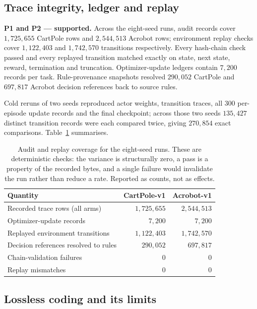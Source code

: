\documentclass[11pt,a4paper]{article}
\begin{document}
\subsection{Trace integrity, ledger and replay}
\label{sec:res-audit}

\textbf{P1 and P2 --- supported.} Across the eight-seed runs, audit records cover $1{,}725{,}655$ CartPole rows and $2{,}544{,}513$ Acrobot rows; environment replay checks cover $1{,}122{,}403$ and $1{,}742{,}570$ transitions respectively. Every hash-chain check passed and every replayed transition matched exactly on state, next state, reward, termination and truncation. Optimizer-update ledgers contain $7{,}200$ records per task. Rule-provenance snapshots resolved $290{,}052$ CartPole and $697{,}817$ Acrobot decision references back to source rules.

Cold reruns of two seeds reproduced actor weights, transition traces, all $300$ per-episode update records and the final checkpoint; across those two seeds $135{,}427$ distinct transition records were each compared twice, giving $270{,}854$ exact comparisons. Table~\ref{tab:audit} summarises.

\begin{table}[H]
\centering
\caption{Audit and replay coverage for the eight-seed runs. These are deterministic checks: the variance is structurally zero, a pass is a property of the recorded bytes, and a single failure would invalidate the run rather than reduce a rate. Reported as counts, not as effects.}
\label{tab:audit}
\small
\begin{tabular}{@{}lrr@{}}
\toprule
\textbf{Quantity} & \textbf{CartPole-v1} & \textbf{Acrobot-v1} \\
\midrule
Recorded trace rows (all arms) & $1{,}725{,}655$ & $2{,}544{,}513$ \\
Optimizer-update records & $7{,}200$ & $7{,}200$ \\
Replayed environment transitions & $1{,}122{,}403$ & $1{,}742{,}570$ \\
Decision references resolved to rules & $290{,}052$ & $697{,}817$ \\
Chain-validation failures & $0$ & $0$ \\
Replay mismatches & $0$ & $0$ \\
\bottomrule
\end{tabular}
\end{table}

\subsection{Lossless coding and its limits}
\end{document}
